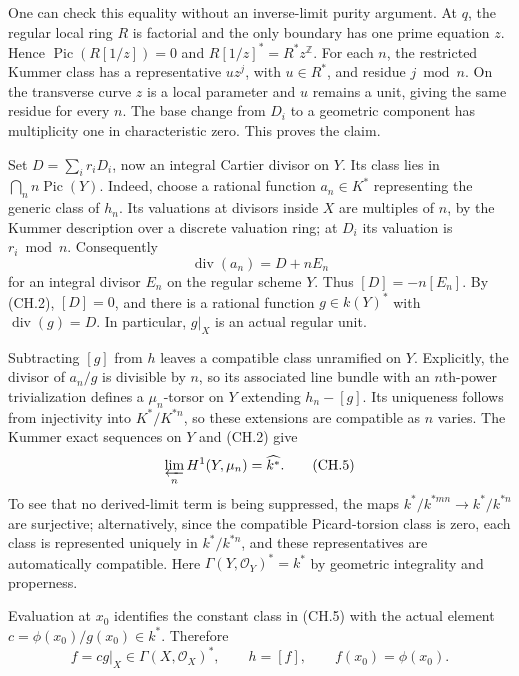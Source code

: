 One can check this equality without an inverse-limit purity argument.
At $q$, the regular local ring $R$ is factorial and the only boundary
has one prime equation $z$. Hence
$\operatorname{Pic}(R[1/z])=0$ and
$R[1/z]^*=R^*z^{\mathbb Z}$. For each $n$, the restricted Kummer
class has a representative $u z^j$, with $u\in R^*$, and residue
$j\bmod n$. On the transverse curve $z$ is a local parameter and
$u$ remains a unit, giving the same residue for every $n$. The base
change from $D_i$ to a geometric component has multiplicity one in
characteristic zero. This proves the claim.

Set $D=\sum_i r_iD_i$, now an integral Cartier divisor on $Y$.
Its class lies in $\bigcap_n n\operatorname{Pic}(Y)$. Indeed, choose
a rational function $a_n\in K^*$ representing the generic class of
$h_n$. Its valuations at divisors inside $X$ are multiples of $n$, by
the Kummer description over a discrete valuation ring; at $D_i$ its
valuation is $r_i\bmod n$. Consequently
\[
                    \operatorname{div}(a_n)=D+nE_n
                                                               \tag{CH.4}
\]
for an integral divisor $E_n$ on the regular scheme $Y$.
Thus $[D]=-n[E_n]$. By (CH.2), $[D]=0$, and there is a rational
function $g\in k(Y)^*$ with $\operatorname{div}(g)=D$. In
particular, $g|_X$ is an actual regular unit.

Subtracting $[g]$ from $h$ leaves a compatible class unramified on
$Y$. Explicitly, the divisor of $a_n/g$ is divisible by $n$, so its
associated line bundle with an $n$th-power trivialization defines a
$\mu_n$-torsor on $Y$ extending $h_n-[g]$. Its uniqueness follows
from injectivity into $K^*/K^{*n}$, so these extensions are compatible
as $n$ varies. The Kummer exact sequences on $Y$ and (CH.2) give
\[
  \varprojlim_n H^1(Y,\mu_n)=\widehat{k^*}.
                                                               \tag{CH.5}
\]
To see that no derived-limit term is being suppressed, the maps
$k^*/k^{*mn}\to k^*/k^{*n}$ are surjective; alternatively, since the
compatible Picard-torsion class is zero, each class is represented
uniquely in $k^*/k^{*n}$, and these representatives are automatically
compatible. Here $\Gamma(Y,\mathcal O_Y)^*=k^*$ by geometric
integrality and properness.

Evaluation at $x_0$ identifies the constant class in (CH.5) with the
actual element $c=\phi(x_0)/g(x_0)\in k^*$. Therefore
\[
        f=cg|_X\in\Gamma(X,\mathcal O_X)^*,\qquad
        h=[f],\qquad f(x_0)=\phi(x_0).                 \tag{CH.6}
\]

